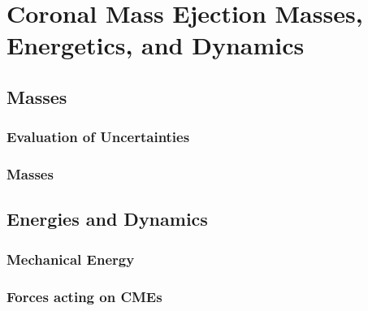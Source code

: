 

\chapter{Coronal Mass Ejection Masses, Energetics, and Dynamics} 
\label{chap:4}


\section{Masses}\label{sec:1}

\subsection{Evaluation of Uncertainties}\label{sec:10}

\subsection{Masses}\label{sec:11}

\section{Energies and Dynamics}\label{sec:2}

\subsection{Mechanical Energy}\label{sec:20}

\subsection{Forces acting on CMEs}\label{sec:21}


